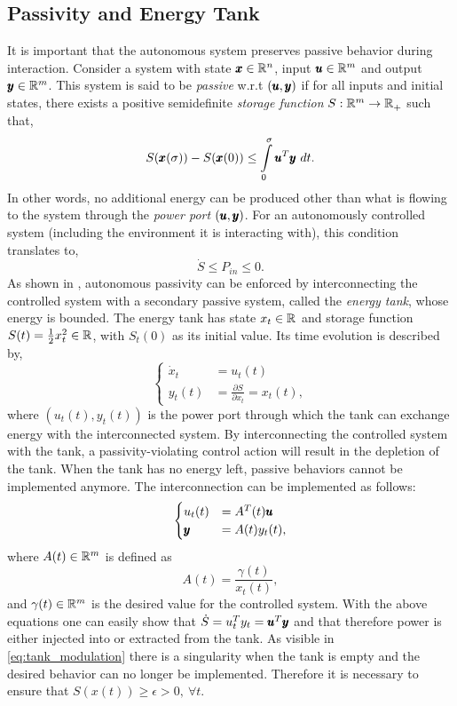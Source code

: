 \subsection{Passivity and Energy Tank}
It is important that the autonomous system preserves passive behavior during interaction. Consider a system with state $\pmb{x} \in \mathbb{R}^{n}$, input $\pmb{u} \in \mathbb{R}^{m}$ and output $\pmb{y} \in \mathbb{R}^{m}$. 
This system is said to be \emph{passive} w.r.t $(\pmb{u},\pmb{y})$ if for all inputs and initial states, there exists a positive semidefinite \emph{storage function} $S: \mathbb{R}^{m} \rightarrow \mathbb{R}^{}_+$ such that,
\begin{equation}
    S(\pmb{x}(\sigma)) - S(\pmb{x}(0))\leq \int\limits_{0}^{\sigma} \pmb{u}^T \pmb{y}\ dt.  
\end{equation}
In other words, no additional energy can be produced other than what is flowing to the system through the \textit{power port} $(\pmb{u},\pmb{y})$.
For an autonomously controlled system (including the environment it is interacting with), this condition translates to, 
\begin{equation}
    \dot{S} \leq P_{in} \leq 0.
\end{equation}
As shown in \cite{shahriari2018valve}, autonomous passivity can be enforced by interconnecting the controlled system with a secondary passive system, called the \emph{energy tank}, whose energy is bounded. The energy tank has state $x_t \in \mathbb{R}^{}$ and storage function $S(t) = \frac{1}{2} x_t^2 \in \mathbb{R}^{}$, with $S_t(0)$ as its initial value. Its time evolution is described by,
\begin{equation}
\begin{cases}
\dot{x}_t &= u_t(t) \\
y_t(t) &= \frac{\partial S}{\partial x_t} = x_t(t),
\end{cases}
\end{equation}
where $(u_t(t), y_t(t))$ is the power port through which the tank can exchange energy with the interconnected system. By interconnecting the controlled system with the tank, a passivity-violating control action will result in the depletion of the tank. When the tank has no energy left, passive behaviors cannot be implemented anymore. The interconnection can be implemented as follows:
\begin{equation}
\begin{cases}
    u_t(t) &= A^T(t) \pmb{u} \\
    \pmb{y} &= A(t) y_t(t),
\end{cases}
\end{equation}
where $A(t) \in \mathbb{R}^{m}$ is defined as
\begin{equation} \label{eq:tank_modulation}
    A(t) = \frac{\gamma(t)}{x_t(t)},
\end{equation}
and $\gamma(t) \in \mathbb{R}^{m}$ is the desired value for the controlled system. With the above equations one can easily show that $\dot{S} = u_t^T y_t = \pmb{u}^T \pmb{y}$ and that therefore power is either injected into or extracted from the tank. As visible in \eqref{eq:tank_modulation} there is a singularity when the tank is empty and the desired behavior can no longer be implemented. 
Therefore it is necessary to ensure that $S(x(t)) \geq \epsilon > 0, \ \forall t$.